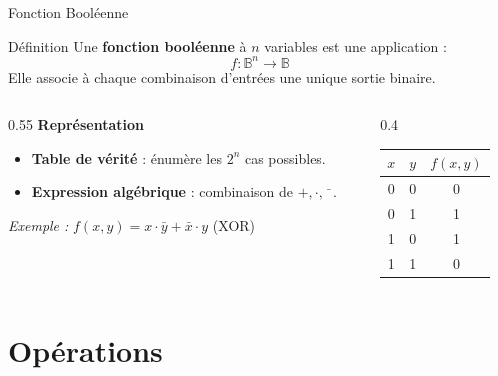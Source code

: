 \begin{frame}{Fonction Booléenne}

    \begin{block}{Définition}
        Une \textbf{fonction booléenne} à \(n\) variables est une application :
        \[
            f : \mathbb{B}^n \to \mathbb{B}
        \]
        Elle associe à chaque combinaison d'entrées une unique sortie binaire.
    \end{block}

    \vspace{0.4cm}

    \begin{columns}[T]
        \begin{column}{0.55\textwidth}
            \textbf{Représentation}
            \begin{itemize}
                \item \textbf{Table de vérité} : énumère les \(2^n\) cas possibles.
                \item \textbf{Expression algébrique} : combinaison de \(+, \cdot, \bar{\phantom{x}}\).
            \end{itemize}

            \vspace{0.3cm}
            \textit{Exemple :} \(f(x,y) = x \cdot \bar{y} + \bar{x} \cdot y\) (XOR)
        \end{column}
        \begin{column}{0.4\textwidth}
            \centering
            \begin{tabular}{|c|c|c|}
                \hline
                \(x\) & \(y\) & \(f(x,y)\) \\
                \hline
                0 & 0 & 0 \\
                0 & 1 & 1 \\
                1 & 0 & 1 \\
                1 & 1 & 0 \\
                \hline
            \end{tabular}
        \end{column}
    \end{columns}

\end{frame}

\section{Opérations}

